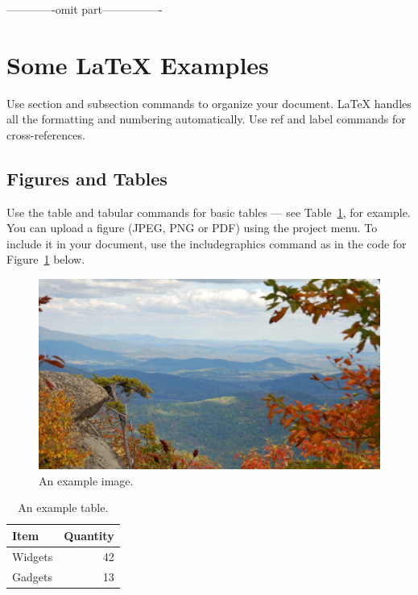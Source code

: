 \documentclass[fleqn,10pt,lineno]{wlpeerj} %
\begin{document}




-------------omit part----------------
\section*{Some \LaTeX{} Examples}
\label{sec:examples}

Use section and subsection commands to organize your document. \LaTeX{} handles all the formatting and numbering automatically. Use ref and label commands for cross-references.

\subsection*{Figures and Tables}

Use the table and tabular commands for basic tables --- see Table~\ref{tab:widgets}, for example. You can upload a figure (JPEG, PNG or PDF) using the project menu. To include it in your document, use the includegraphics command as in the code for Figure~\ref{fig:view} below.

\begin{figure}[ht]
\centering
\includegraphics[width=\linewidth]{view.jpg}
\caption{An example image.}
\label{fig:view}
\end{figure}

\begin{table}[ht]
\centering
\begin{tabular}{l|r}
Item & Quantity \\\hline
Widgets & 42 \\
Gadgets & 13
\end{tabular}
\caption{\label{tab:widgets}An example table.}
\end{table}
\end{document}
